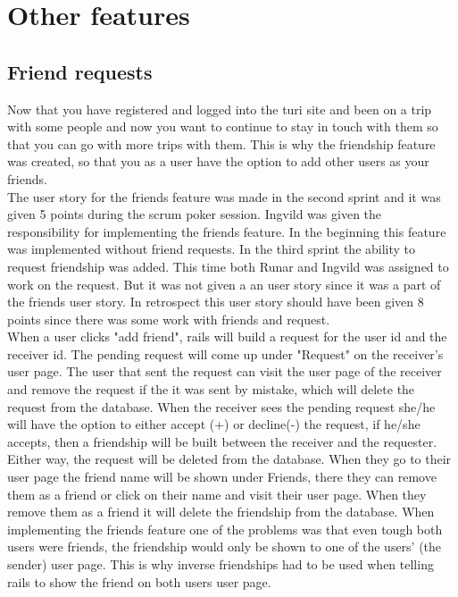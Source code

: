 \documentclass[a4paper]{article}
\begin{document}
\section{Other features}
\subsection{Friend requests}
Now that you have registered and logged into the turi site and been on a trip with some people and now you want to continue to stay in touch with them so that you can go with more trips with them. This is why the friendship feature was created, so that you as a user have the option to add other users as your friends. \\

\noindent
The user story for the friends feature was made in the second sprint and it was given 5 points during the scrum poker session. Ingvild was given the responsibility for implementing the friends feature. In the beginning this feature was implemented without friend requests. In the third sprint the ability to request friendship was added. This time both Runar and Ingvild was assigned to work on the request. But it was not given a an user story since it was a part of the friends user story. In retrospect this user story should have been given 8 points since there was some work with friends and request. \\

\noindent
When a user clicks "add friend", rails will build a request for the user id and the receiver id. The pending request will come up under "Request" on the receiver's user page. The user that sent the request can visit the user page of the receiver and remove the request if the it was sent by mistake, which will delete the request from the database. When the receiver sees the pending request she/he will have the option to either accept (+) or decline(-) the request, if he/she accepts, then a friendship will be built between the receiver and the requester. Either way, the request will be deleted from the database. When they go to their user page the friend name will be shown under Friends, there they can remove them as a friend or click on their name and visit their user page. When they remove them as a friend it will delete the friendship from the database. When implementing the friends feature one of the problems was that even tough both users were friends, the friendship would only be shown to one of the users' (the sender) user page. This is why inverse friendships had to be used when telling rails to show the friend on both users user page. \\
\end{document}
